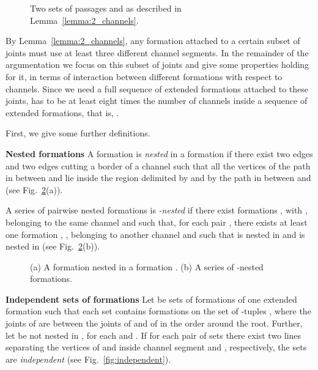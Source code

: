 \documentclass[a4paper,10pt]{llncs}
\newcounter{prop}
\begin{document}
\begin{figure}[tb]
\caption{Two sets of passages  and  as described in Lemma~\ref{lemma:2_channels}.}
  \label{fig:lemma5}
\end{figure}

By Lemma~\ref{lemma:2_channels}, any formation attached to a certain subset of joints must use at least three different channel segments. In the remainder of the argumentation we focus on this subset of joints and give some properties holding for it, in terms of interaction between different formations with respect to channels. Since we need a full sequence of extended formations attached to these joints,  has to be at least eight times the number of channels inside a sequence of extended formations, that is, .

First, we give some further definitions.

{\bf Nested formations}
A formation  is {\it nested} in a formation  if there exist two edges  and two edges  cutting a border  of a channel  such that all the vertices of the path in  between  and  lie inside the region delimited by  and by the path in  between  and  (see Fig.~\ref{fig:nested_formations}(a)).

A series of pairwise nested formations  is {\it -nested} if there exist  formations , with , belonging to the same channel and such that, for each pair , there exists at least one formation , , belonging to another channel and such that  is nested in  and  is nested in  (see Fig.~\ref{fig:nested_formations}(b)).

\begin{figure}[htb]
\caption{(a) A formation  nested in a formation . (b) A series of -nested formations.}
  \label{fig:nested_formations}
\end{figure}

{\bf Independent sets of formations}
Let  be sets of formations of one extended formation such that each set  contains formations  on the set of -tuples , where the joints of  are between the joints of  and of  in the order around the root. Further, let  be not nested in , for each  and . If for each pair of sets  there exist two lines  separating the vertices of  and  inside channel segment  and , respectively, the sets are \emph{independent} (see Fig.~\ref{fig:independent}).
\end{document}

